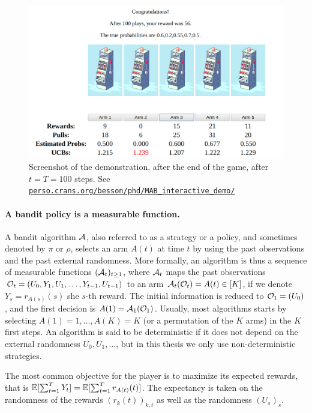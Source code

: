 \begin{figure}[h!]  %
    \centering
    \includegraphics[width=0.95\linewidth]{2-Chapters/2-Chapter/Images/example_of_a_5_arm_bandit_problem__step100.png}
    \caption{Screenshot of the demonstration, after the end of the game, after $t=T=100$ steps.  See \href{https://perso.crans.org/besson/phd/MAB\_interactive\_demo/}{\texttt{perso.crans.org/besson/phd/MAB\_interactive\_demo/}}}
    \label{fig:2:example_of_a_5_arm_bandit_problem__step100}
\end{figure}


\paragraph{A bandit policy is a measurable function.}

A bandit algorithm $\mathcal{A}$, also referred to as a strategy or a policy, and sometimes denoted by $\pi$ or $\rho$, selects an arm $A(t)$ at time $t$ by using the past observations and the past external randomness.
More formally, an algorithm is thus a sequence of measurable functions $(\mathcal{A}_t)_{t\geq1}$,
where $\mathcal{A}_t$ maps the past observations $\mathcal{O}_t = (U_0, Y_1, U_1, \dots, Y_{t-1}, U_{t-1})$
to an arm $\mathcal{A}_t(\mathcal{O}_t) = A(t) \in[K]$,
if we denote $Y_s = r_{A(s)}(s)$ she $s$-th reward.
The initial information is reduced to $\mathcal{O}_1 = (U_0)$, and the first decision is $A(1) = \mathcal{A}_1(\mathcal{O}_1)$. Usually, most algorithms starts by selecting $A(1)=1,\dots,A(K)=K$ (or a permutation of the $K$ arms) in the $K$ first steps.
%
An algorithm is said to be deterministic if it does not depend on the external randomness $U_0,U_1,\dots$, but in this thesis we only use non-deterministic strategies.

The most common objective for the player is to maximize its expected rewards, that is $\mathbb{E}[\sum_{t=1}^T Y_t] = \mathbb{E}[\sum_{t=1}^T r_{A(t)}(t)]$.
The expectancy is taken on the randomness of the rewards $(r_k(t))_{k,t}$ as well as the randomness $(U_s)_s$.

